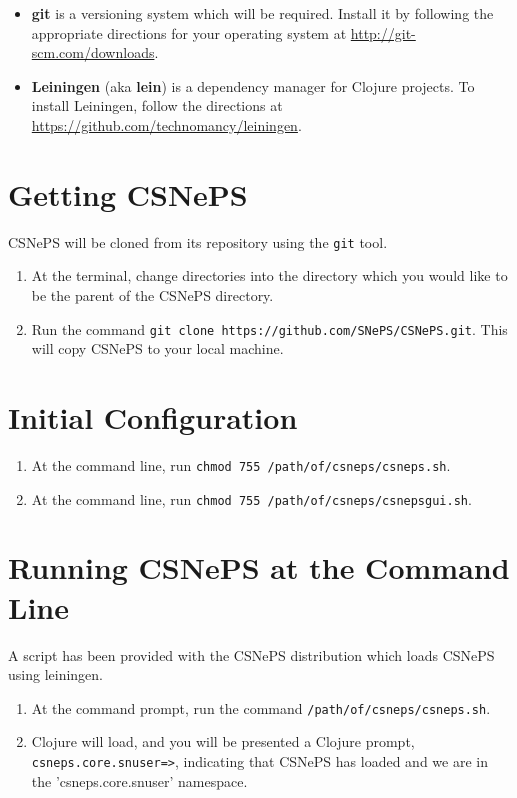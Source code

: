 \documentclass[letterpaper,colorlinks=true,linkcolor=blue]{book}
\begin{document}
\begin{itemize}
  \item \textbf{git} is a versioning system which will be required. Install it
  by following the appropriate directions for your operating system at \url{http://git-scm.com/downloads}.
  \item \textbf{Leiningen} (aka \textbf{lein}) is a dependency manager for 
  Clojure projects. To install Leiningen, follow the directions at 
  \url{https://github.com/technomancy/leiningen}.
\end{itemize}

\section{Getting CSNePS}

CSNePS will be cloned from its repository using the \texttt{git} tool.

\begin{enumerate}
  \item At the terminal, change directories into the directory which you would like to be the parent of the CSNePS directory. 
  \item Run the command \texttt{git clone https://github.com/SNePS/CSNePS.git}. This will copy CSNePS to your local machine.
\end{enumerate}

\section{Initial Configuration}

\begin{enumerate}
  \item At the command line, run \texttt{chmod 755 /path/of/csneps/csneps.sh}.
  \item At the command line, run \texttt{chmod 755 /path/of/csneps/csnepsgui.sh}.
\end{enumerate}

\section{Running CSNePS at the Command Line}\label{sec:loadcmd}

A script has been provided with the CSNePS distribution which loads CSNePS using leiningen.

\begin{enumerate}
  \item At the command prompt, run the command \texttt{/path/of/csneps/csneps.sh}.
  \item Clojure will load, and you will be presented a 
  Clojure prompt, \texttt{csneps.core.snuser=>}, indicating that CSNePS has loaded and we are in the 'csneps.core.snuser' namespace.
\end{enumerate}
\end{document}
